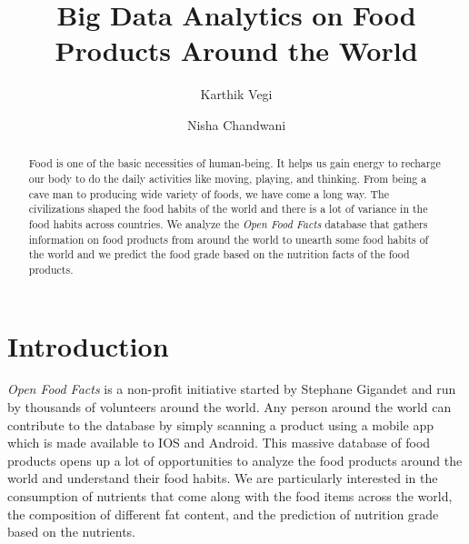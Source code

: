 \documentclass[sigconf]{acmart}
\begin{document}
\title{Big Data Analytics on Food Products Around the World}

\author{Karthik Vegi}

\author{Nisha Chandwani}

\renewcommand{\shortauthors}{kvegi,nchandwa}

\begin{abstract}
Food is one of the basic necessities of human-being. It helps us gain energy to recharge our body to do the daily activities like moving, playing, and thinking. From being a cave man to producing wide variety of foods, we have come a long way. The civilizations shaped the food habits of the world and there is a lot of variance in the food habits across countries. We analyze the {\em Open Food Facts} database that gathers information on food products from around the world to unearth some food habits of the world and we predict the food grade based on the nutrition facts of the food products.
\end{abstract}


\maketitle

\section{Introduction}
{\em Open Food Facts} is a non-profit initiative started by Stephane Gigandet and run by thousands of volunteers around the world. Any person around the world can contribute to the database by simply scanning a product using a mobile app which is made available to IOS and Android. This massive database of food products opens up a lot of opportunities to analyze the food products around the world and understand their food habits. We are particularly interested in the consumption of nutrients that come along with the food items across the world, the composition of different fat content, and the prediction of nutrition grade based on the nutrients.
\end{document}
